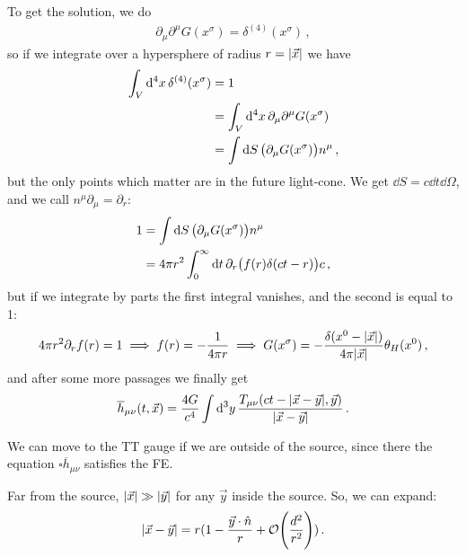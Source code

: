 \documentclass[main.tex]{subfiles}
\begin{document}
To get the solution, we do 
%
\begin{align}
\partial_{\mu } \partial^{\mu } G(x^{\sigma }) = \delta^{(4)} (x^{\sigma })
\,,
\end{align}
%
so if we integrate over a hypersphere of radius \(r = \abs{\vec{x}}\) we have 
%
\begin{subequations}
\begin{align}
\int_V \dd[4]{x} \delta^{(4)} (x^{\sigma }) &= 1  \\
&= \int_{V} \dd[4]{x} \partial_{\mu } \partial^{\mu } G(x^{\sigma })  \\
&= \int \dd{S} \qty(\partial_{\mu } G(x^{\sigma })) n^{\mu } 
\,,
\end{align}
\end{subequations}
%
but the only points which matter are in the future light-cone. We get \(\dd{S} = c \dd{t}  \dd{\Omega }\), and we call \(n^{\mu } \partial_{\mu } = \partial_{r}\): 
%
\begin{subequations}
\begin{align}
1 &= \int \dd{S} \qty(\partial_{\mu } G(x^{\sigma })) n^{\mu }  \\
&= 4 \pi r^2 \int_0^{ \infty } \dd{t} \partial_{r} \qty(f(r) \delta (ct-r) )c
\,,
\end{align}
\end{subequations}
%
but if we integrate by parts the first integral vanishes, and the second is equal to 1: 
%
\begin{align}
4 \pi r^2 \partial_{r} f(r) = 1 \implies 
f(r) = - \frac{1}{4 \pi r}
\implies G(x^{\sigma }) = - \frac{ \delta (x^{0} - \abs{\vec{x}})}{4 \pi \abs{\vec{x}}} \theta_H (x^{0})
\,,
\end{align}
%
and after some more passages we finally get 
%
\begin{align}
\overline{h}_{\mu \nu } 
(t, \vec{x}) = 
\frac{4G}{c^{4}}
\int \dd[3]{y} \frac{T_{\mu \nu } (ct - \abs{\vec{x}-\vec{y}}, \vec{y})}{\abs{\vec{x} - \vec{y}}}
\,.
\end{align}

We can move to the TT gauge if we are outside of the source, since there the equation \(\square \overline{h}_{\mu \nu }\) satisfies the FE. 

Far from the source, \(\abs{\vec{x}} \gg \abs{\vec{y}}\) for any \(\vec{y}\) inside the source. So, we can expand: 
%
\begin{align}
\abs{\vec{x} - \vec{y}} = r (1 - \frac{\vec{y} \cdot \hat{n}}{r} + \order{\frac{d^2}{r^2}})
\,.
\end{align}
\end{document}
